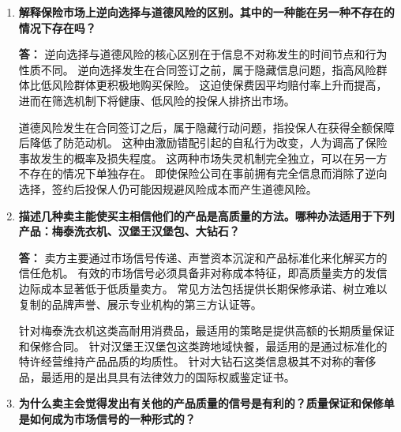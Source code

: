 \begin{enumerate}[label=\textbf{\arabic*.}, leftmargin=*]
\begin{center}
		\end{center}
		
		\item \textbf{解释保险市场上逆向选择与道德风险的区别。其中的一种能在另一种不存在的情况下存在吗？}
		
		\textbf{答：} 逆向选择与道德风险的核心区别在于信息不对称发生的时间节点和行为性质不同。
		逆向选择发生在合同签订之前，属于隐藏信息问题，指高风险群体比低风险群体更积极地购买保险。
		这迫使保费因平均赔付率上升而提高，进而在筛选机制下将健康、低风险的投保人排挤出市场。
		
		道德风险发生在合同签订之后，属于隐藏行动问题，指投保人在获得全额保障后降低了防范动机。
		这种由激励错配引起的自私行为改变，人为调高了保险事故发生的概率及损失程度。
		这两种市场失灵机制完全独立，可以在另一方不存在的情况下单独存在。
		即使保险公司在事前拥有完全信息而消除了逆向选择，签约后投保人仍可能因规避风险成本而产生道德风险。
		
		\item \textbf{描述几种卖主能使买主相信他们的产品是高质量的方法。哪种办法适用于下列产品：梅泰洗衣机、汉堡王汉堡包、大钻石？}
		
		\textbf{答：} 卖方主要通过市场信号传递、声誉资本沉淀和产品标准化来化解买方的信任危机。
		有效的市场信号必须具备非对称成本特征，即高质量卖方的发信边际成本显著低于低质量卖方。
		常见方法包括提供长期保修承诺、树立难以复制的品牌声誉、展示专业机构的第三方认证等。
		
		针对梅泰洗衣机这类高耐用消费品，最适用的策略是提供高额的长期质量保证和保修合同。
		针对汉堡王汉堡包这类跨地域快餐，最适用的是通过标准化的特许经营维持产品品质的均质性。
		针对大钻石这类信息极其不对称的奢侈品，最适用的是出具具有法律效力的国际权威鉴定证书。
		
		\item \textbf{为什么卖主会觉得发出有关他的产品质量的信号是有利的？质量保证和保修单是如何成为市场信号的一种形式的？}
		

\end{enumerate}
